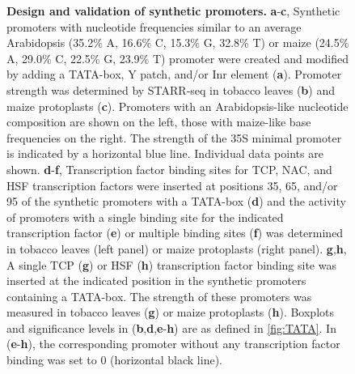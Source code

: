 \documentclass[10pt, english]{article}
\newcommand{\fignormal}{\scriptsize}
\newcommand{\titleend}{ }
\newcommand{\nextentry}{ }
\newcounter{fig}
\newenvironment{fig}{%
	\begin{figure}%
		\stepcounter{fig}%
		\pdfbookmark{\figurename\ \thefig}{figure\thefig}
		\tikzsetnextfilename{figure\thefig}%
		\fignormal%
		\centering%
}{%
	\end{figure}%
	\clearpage
}
\newif\ifsubfigupper
\newcounter{subfig}[figure]
\newcommand{\plainsubfigref}[1]{\textbf{\ifsubfigupper\uppercase{#1}\else\lowercase{#1}\fi}}
\newcommand{\subfigref}[1]{\textbf{\plainsubfigref{#1}},}
\newcommand{\subfigrange}[2]{\textbf{\plainsubfigref{#1}}-\textbf{\plainsubfigref{#2}},}
\newcommand{\parensubfig}[2][]{(#1\textbf{\plainsubfigref{#2}})}
\newcommand{\parensubfigrange}[3][]{(#1\textbf{\plainsubfigref{#2}}-\textbf{\plainsubfigref{#3}})}
\begin{document}
		\begin{fig}
			\caption{
				\textbf{Design and validation of synthetic promoters.}\titleend
				\subfigrange{A}{C} Synthetic promoters with nucleotide frequencies similar to an average Arabidopsis (35.2\% A, 16.6\% C, 15.3\% G, 32.8\% T) or maize (24.5\% A, 29.0\% C, 22.5\% G, 23.9\% T) promoter were created and modified by adding a TATA-box, Y patch, and/or Inr element \parensubfig{A}. Promoter strength was determined by STARR-seq in tobacco leaves \parensubfig{B} and maize protoplasts \parensubfig{C}. Promoters with an Arabidopsis-like nucleotide composition are shown on the left, those with maize-like base frequencies on the right. The strength of the 35S minimal promoter is indicated by a horizontal blue line. Individual data points are shown.\nextentry
				\subfigrange{D}{F} Transcription factor binding sites for TCP, NAC, and HSF transcription factors were inserted at positions 35, 65, and/or 95 of the synthetic promoters with a TATA-box \parensubfig{D} and the activity of promoters with a single binding site for the indicated transcription factor \parensubfig{E} or multiple binding sites \parensubfig{F} was determined in tobacco leaves (left panel) or maize protoplasts (right panel).
				\subfigref{G}\subfigref{H} A single TCP \parensubfig{G} or HSF \parensubfig{H} transcription factor binding site was inserted at the indicated position in the synthetic promoters containing a TATA-box. The strength of these promoters was measured in tobacco leaves \parensubfig{G} or maize protoplasts \parensubfig{H}. Boxplots and significance levels in \parensubfigrange[\subfigref{B}\subfigref{D}]{E}{H} are as defined in \autoref{fig:TATA}. In (\textbf{\plainsubfigref{E}}-\textbf{\plainsubfigref{H}}), the corresponding promoter without any transcription factor binding was set to 0 (horizontal black line).
			}%
			\label{fig:synthetic}
		\end{fig}
		
\end{document}
